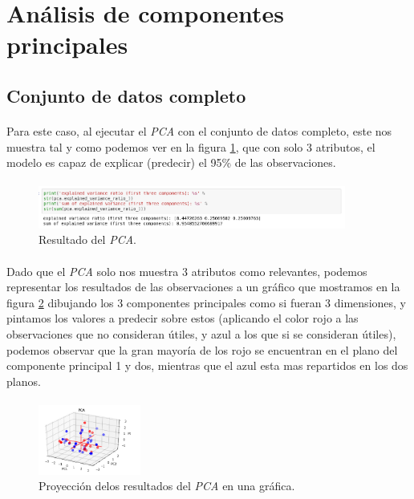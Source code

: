\section{Análisis de componentes principales}
\label{resultados:pca}

\subsection{Conjunto de datos completo}

\paragraph{}
Para este caso, al ejecutar el \textit{PCA} con el conjunto de datos completo, este nos muestra tal y como podemos ver en la figura \ref{pcaOneResult}, que con solo 3 atributos, el modelo es capaz de explicar (predecir) el 95\% de las observaciones.

\paragraph{}
\begin{figure}[!htb]
  \centering
    \includegraphics[width=0.9\textwidth]{images/resultados_procesado_de_datos_pca1_result.png}
    \caption{Resultado del \textit{PCA}.}
  \label{pcaOneResult}
\end{figure}

\paragraph{}
Dado que el \textit{PCA} solo nos muestra 3 atributos como relevantes, podemos representar los resultados de las observaciones a un gráfico que mostramos en la figura \ref{pcaOneGraphic} dibujando los 3 componentes principales como si fueran 3 dimensiones, y pintamos los valores a predecir sobre estos (aplicando el color rojo a las observaciones que no consideran útiles, y azul a los que si se consideran útiles), podemos observar que la gran mayoría de los rojo se encuentran en el plano del componente principal 1 y dos, mientras que el azul esta mas repartidos en los dos planos.

\paragraph{}
\begin{figure}[!htb]
  \centering
    \includegraphics[width=0.3\textwidth]{images/resultados_procesado_de_datos_pca1_graphic.png}
    \caption{Proyección delos resultados del \textit{PCA} en una gráfica.}
  \label{pcaOneGraphic}
\end{figure}

